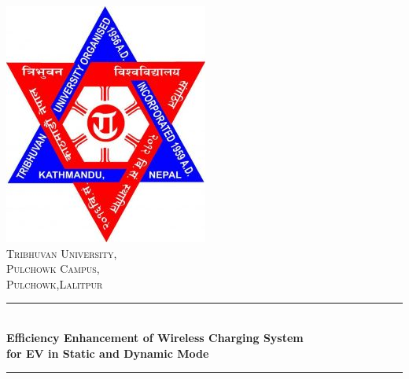 \begin{titlepage}
	\newcommand{\HRule}{\rule{\linewidth}{1mm}} %
	\center %
	\includegraphics[scale=0.5]{logo.jpg}\\[1cm] %
	\textsc{\LARGE Tribhuvan University, }\\[0.4cm] %
	\textsc{\Large Pulchowk Campus,}\\[0.4cm] %
	\textsc{\large Pulchowk,Lalitpur}\\[0.4cm] %
	\HRule \\[0.4cm]
	{ \large \bfseries Efficiency Enhancement of Wireless Charging System \\[0.3cm] for EV in Static and Dynamic Mode} \\[0.4cm] %
	\HRule \\[1.5cm]



\end{titlepage}
